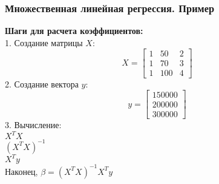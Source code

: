 \documentclass[aspectratio=169]{beamer}
\begin{document}
\begin{frame}
\frametitle{Множественная линейная регрессия. Пример}
{\bf Шаги для расчета коэффициентов:}\\
1. Создание матрицы \(X\):
   \[
   X = \begin{bmatrix}
   1 & 50 & 2 \\
   1 & 70 & 3 \\
   1 & 100 & 4
   \end{bmatrix}
   \]
2. Создание вектора \(y\):
   \[
   y = \begin{bmatrix}
   150000 \\
   200000 \\
   300000
   \end{bmatrix}
   \]
3. Вычисление:\\
\quad \(X^T X\)\\
\quad \((X^T X)^{-1}\)\\
\quad \(X^T y\)\\
\quad Наконец, \(\beta = (X^T X)^{-1} X^T y\)
\end{frame}
\end{document}
